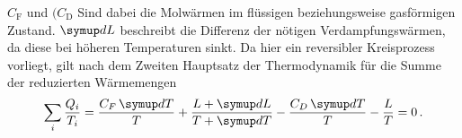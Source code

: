 $C_\text{F}$ und $(C_\text{D}$ Sind dabei die Molwärmen im flüssigen beziehungsweise gasförmigen Zustand.
$\dif{L}$ beschreibt die Differenz der nötigen Verdampfungswärmen, da diese bei höheren Temperaturen sinkt.
Da hier ein reversibler Kreisprozess vorliegt, gilt nach dem Zweiten Hauptsatz der Thermodynamik für 
die Summe der reduzierten Wärmemengen
\begin{equation}
    \sum_{i} \frac{Q_{i}}{T_{i}} = 
    \frac {C_{F}\dif{T}} {T} + \frac {L+\dif{L}} {T+\dif{T}} - \frac {C_{D}\dif{T}} {T}-\frac{L}{T} =
    0 \, .
\end{equation}

